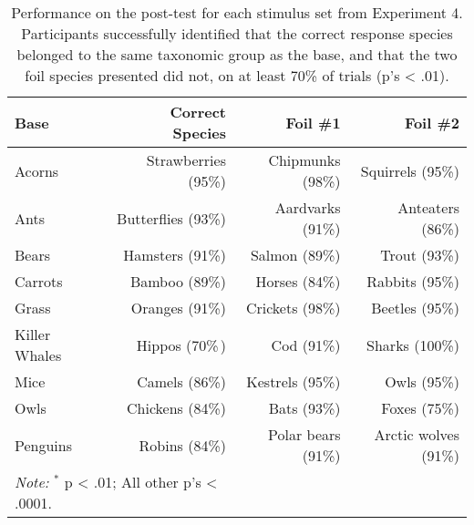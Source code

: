 
\begin{table}[!h]
  \centering
  \caption[]{
    Performance on the post-test for each stimulus set from Experiment 4.
    Participants successfully identified that the correct response species
    belonged to the same taxonomic group as the base,
    and that the two foil species presented did not,
    on at least 70\% of trials (p's < .01).
  }
  \begin{tabular}{lrrr}
    \toprule
    Base          & Correct Species      & Foil \#1           & Foil \#2 \\
    \midrule
    Acorns        & Strawberries (95\%)  & Chipmunks (98\%)   & Squirrels (95\%)\\
    Ants          & Butterflies (93\%)   & Aardvarks (91\%)   & Anteaters (86\%)\\
    Bears         & Hamsters (91\%)      & Salmon (89\%)      & Trout (93\%)\\
    Carrots       & Bamboo (89\%)        & Horses (84\%)      & Rabbits (95\%)\\
    Grass         & Oranges (91\%)       & Crickets (98\%)    & Beetles (95\%)\\
    Killer Whales & Hippos (70\%$^{\*}$) & Cod (91\%)         & Sharks (100\%)\\
    Mice          & Camels (86\%)        & Kestrels (95\%)    & Owls (95\%)\\
    Owls          & Chickens (84\%)      & Bats (93\%)        & Foxes (75\%)\\
    Penguins      & Robins (84\%)        & Polar bears (91\%) & Arctic wolves (91\%)\\
    \bottomrule
    \multicolumn{2}{l}{
      \emph{Note:} $^*$ p < .01; All other p's < .0001.
      }
  \end{tabular}
\end{table}


